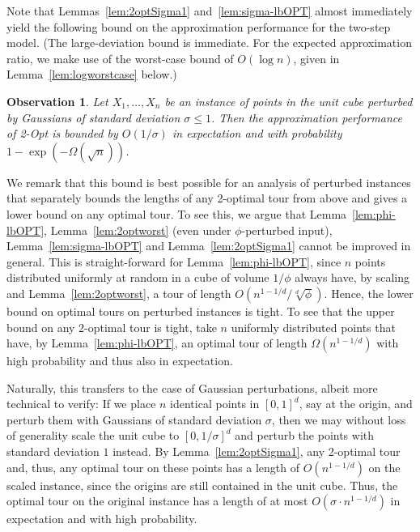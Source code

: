 \documentclass[11pt,DIV=12,a4paper]{scrartcl}
\newtheorem{observation}[claim]{Observation}
\newcommand{\lemref}[1]{Lemma~\ref{lem:#1}}
\begin{document}
Note that Lemmas~\ref{lem:2optSigma1} and~\ref{lem:sigma-lbOPT} almost immediately yield the following bound on the approximation performance for the two-step model.
(The large-deviation bound is immediate. For the expected approximation ratio, we make use of the worst-case bound of $O(\log n)$, given in \lemref{logworstcase}
below.)
\begin{observation}\label{obs:easyApprox}
Let $X_1,\dots,X_n$ be an instance of points in the unit cube perturbed by Gaussians of standard deviation $\sigma \le 1$. Then the approximation performance of 2-Opt is bounded by $O(1/\sigma)$ in expectation and with probability $1-\exp(-\Omega(\sqrt{n}))$.
\end{observation}


We remark that this bound is best possible for an analysis of perturbed instances that separately bounds the lengths of any 2-optimal tour from above and gives a lower bound on any optimal tour. To see this, we argue that Lemma~\ref{lem:phi-lbOPT}, Lemma~\ref{lem:2optworst} (even under $\phi$-perturbed input),
Lemma~\ref{lem:sigma-lbOPT} and Lemma~\ref{lem:2optSigma1} cannot be improved in general. This is straight-forward for Lemma~\ref{lem:phi-lbOPT}, since $n$ points distributed uniformly at random in a cube of volume $1/\phi$ always have, by scaling and Lemma~\ref{lem:2optworst}, a tour of length $O(n^{1-1/d}/\sqrt[d]{\phi})$. Hence, the lower bound on optimal tours on perturbed instances is tight. To see that the upper bound on any 2-optimal tour is tight, take $n$ uniformly distributed points that have, by Lemma~\ref{lem:phi-lbOPT}, an optimal tour of length $\Omega(n^{1-1/d})$ with high probability and thus also in expectation. 


Naturally, this transfers to the case of Gaussian perturbations, albeit more technical to verify: If we place $n$ identical points in $[0,1]^d$, say at the origin, and perturb them with Gaussians of standard deviation $\sigma$, then we may without loss of generality scale the unit cube to $[0,1/\sigma]^d$ and perturb the points with standard deviation $1$ instead. By Lemma~\ref{lem:2optSigma1}, any 2-optimal tour and, thus, any optimal tour on these points has a length of $O(n^{1 - 1/d})$ on the scaled instance, since the origins are still contained in the unit cube.
Thus, the optimal tour on the original instance has a length of at most $O(\sigma \cdot n^{1-1/d})$ in expectation and with high probability.
\end{document}
